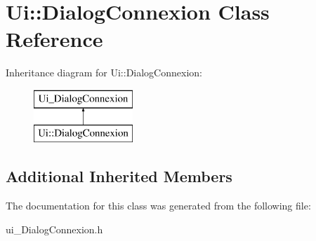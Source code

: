 \section{Ui\-:\-:Dialog\-Connexion Class Reference}
\label{class_ui_1_1_dialog_connexion}
Inheritance diagram for Ui\-:\-:Dialog\-Connexion\-:\begin{figure}[H]
\begin{center}
\leavevmode
\includegraphics[height=2.000000cm]{class_ui_1_1_dialog_connexion}
\end{center}
\end{figure}
\subsection*{Additional Inherited Members}


The documentation for this class was generated from the following file\-:\begin{DoxyCompactItemize}
\item 
ui\-\_\-\-Dialog\-Connexion.\-h\end{DoxyCompactItemize}
